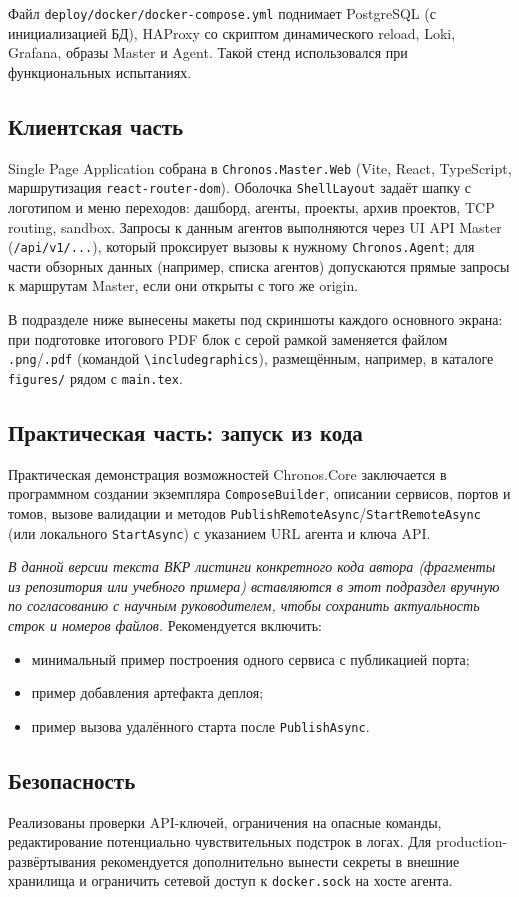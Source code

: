 Файл \texttt{deploy/docker/docker-compose.yml} поднимает PostgreSQL (с инициализацией БД), HAProxy со скриптом динамического reload, Loki, Grafana, образы Master и Agent. Такой стенд использовался при функциональных испытаниях.

\subsection{Клиентская часть}

Single Page Application собрана в \texttt{Chronos.Master.Web} (Vite, React, TypeScript, маршрутизация \texttt{react-router-dom}). Оболочка \texttt{ShellLayout} задаёт шапку с логотипом и меню переходов: дашборд, агенты, проекты, архив проектов, TCP routing, sandbox. Запросы к данным агентов выполняются через UI API Master (\texttt{/api/v1/...}), который проксирует вызовы к нужному \texttt{Chronos.Agent}; для части обзорных данных (например, списка агентов) допускаются прямые запросы к маршрутам Master, если они открыты с того же origin.

В подразделе ниже вынесены макеты под скриншоты каждого основного экрана: при подготовке итогового PDF блок с серой рамкой заменяется файлом \texttt{.png}/\texttt{.pdf} (командой \texttt{\textbackslash includegraphics}), размещённым, например, в каталоге \texttt{figures/} рядом с \texttt{main.tex}.



\subsection{Практическая часть: запуск из кода}

Практическая демонстрация возможностей Chronos.Core заключается в программном создании экземпляра \texttt{ComposeBuilder}, описании сервисов, портов и томов, вызове валидации и методов \texttt{PublishRemoteAsync}/\texttt{StartRemoteAsync} (или локального \texttt{StartAsync}) с указанием URL агента и ключа API.

\textit{В данной версии текста ВКР листинги конкретного кода автора (фрагменты из репозитория или учебного примера) вставляются в этот подраздел вручную по согласованию с научным руководителем, чтобы сохранить актуальность строк и номеров файлов.} Рекомендуется включить:
\begin{itemize}[leftmargin=1.5cm]
  \item минимальный пример построения одного сервиса с публикацией порта;
  \item пример добавления артефакта деплоя;
  \item пример вызова удалённого старта после \texttt{PublishAsync}.
\end{itemize}

\subsection{Безопасность}

Реализованы проверки API-ключей, ограничения на опасные команды, редактирование потенциально чувствительных подстрок в логах. Для production-развёртывания рекомендуется дополнительно вынести секреты в внешние хранилища и ограничить сетевой доступ к \texttt{docker.sock} на хосте агента.
